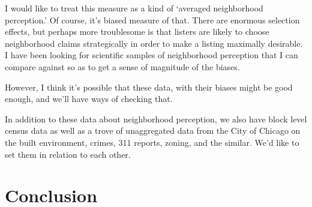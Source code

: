 \documentclass[12pt,letter]{article}
\begin{document}
I would like to treat this measure as a kind of `averaged neighborhood
perception.' Of course, it's biased measure of that. There are
enormous selection effects, but perhaps more troublesome is that
listers are likely to choose neighborhood claims strategically in
order to make a listing maximally desirable. I have been looking for
scientific samples of neighborhood perception that I can compare
against so as to get a sense of magnitude of the biases.

However, I think it's possible that these data, with their biases
might be good enough, and we'll have ways of checking that. 

In addition to these data about neighborhood perception, we also have
block level census data as well as a trove of unaggregated data from
the City of Chicago on the built environment, crimes, 311 reports,
zoning, and the similar. We'd like to set them in relation to each
other.

\section*{Conclusion}
\end{document}
